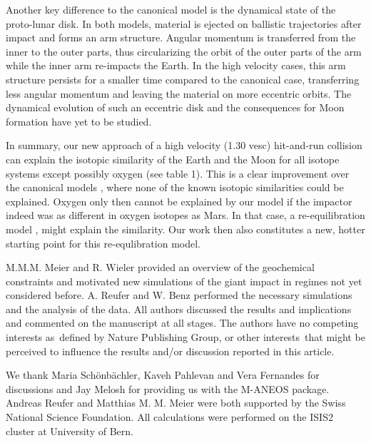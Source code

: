 Another key difference to the canonical model is the dynamical state of the proto-lunar disk. In both models, material is ejected on ballistic trajectories after impact and forms an arm structure. Angular momentum is transferred from the inner to the outer parts, thus circularizing the orbit of the outer parts of the arm while the inner arm re-impacts the Earth. In the high velocity cases, this arm structure persists for a smaller time compared to the canonical case, transferring less angular momentum and leaving the material on more eccentric orbits. The dynamical evolution of such an eccentric disk and the consequences for Moon formation have yet to be studied.

In summary, our new approach of a high velocity (1.30 vesc) hit-and-run collision can explain the isotopic similarity of the Earth and the Moon for all isotope systems except possibly oxygen (see table 1). This is a clear improvement over the canonical models \citep{Canup:2004p115}, where none of the known isotopic similarities could be explained. Oxygen only then cannot be explained by our model if the impactor indeed was as different in oxygen isotopes as Mars. In that case, a re-equilibration model  \citep{Pahlevan:2007p2065}, \citep{2011E&PSL.301..433P} might explain the similarity. Our work then also constitutes a new, hotter starting point for this re-equlibration model. 

M.M.M. Meier and R. Wieler provided an overview of the geochemical constraints and motivated new simulations of the giant impact in regimes not yet considered before. A. Reufer and W. Benz performed the necessary simulations and the analysis of the data. All authors discussed the results and implications and commented on the manuscript at all stages. The authors have no competing interests as defined by Nature Publishing Group, or other interests that might be perceived to influence the results and/or discussion reported in this article.

We thank Maria Schönbächler, Kaveh Pahlevan and Vera Fernandes for discussions and Jay Melosh for providing us with the M-ANEOS package. Andreas Reufer and Matthias M. M. Meier were both supported by the Swiss National Science Foundation. All calculations were performed on the ISIS2 cluster at University of Bern.


